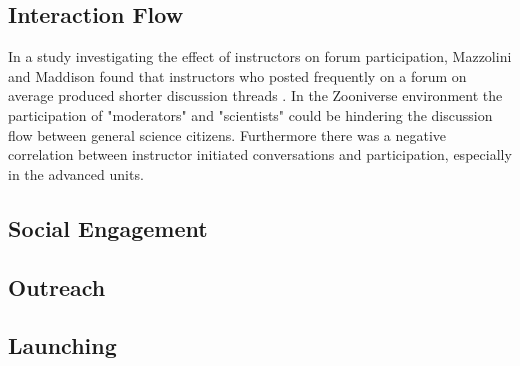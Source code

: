 \documentclass{sigchi}
\begin{document}


\subsection{Interaction Flow}


In a study investigating the effect of instructors on forum participation, Mazzolini and Maddison found that instructors who posted frequently on a forum on average produced shorter discussion threads \cite{mazzolini2003sage}. In the Zooniverse environment the participation of "moderators" and "scientists" could be hindering the discussion flow between general science citizens. Furthermore there was a negative correlation between instructor initiated conversations and participation, especially in the advanced units\cite{mazzolini2003sage}. 


\subsection{Social Engagement}

\subsection{Outreach}

\subsection{Launching}
\end{document}
